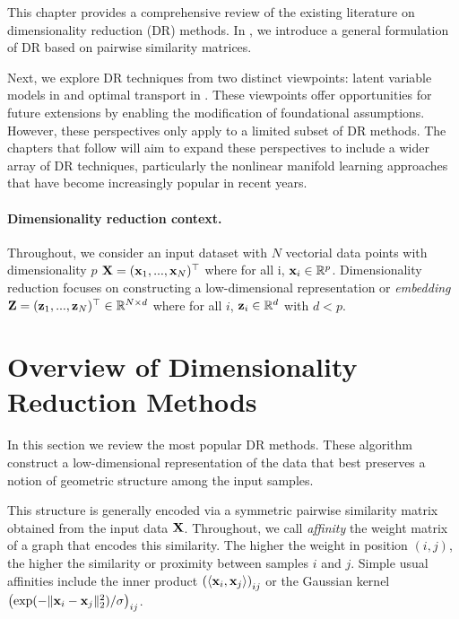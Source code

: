 \newpage

This chapter provides a comprehensive review of the existing literature on dimensionality reduction (DR) methods. In , we introduce a general formulation of DR based on pairwise similarity matrices.

Next, we explore DR techniques from two distinct viewpoints: latent variable models in  and optimal transport in . These viewpoints offer opportunities for future extensions by enabling the modification of foundational assumptions. However, these perspectives only apply to a limited subset of DR methods. The chapters that follow will aim to expand these perspectives to include a wider array of DR techniques, particularly the nonlinear manifold learning approaches that have become increasingly popular in recent years.


\paragraph{Dimensionality reduction context.}
Throughout, we consider an input dataset with $N$ vectorial data points with dimensionality $p$ \ie ${\mathbf{X}} = ({\mathbf{x}}_1, ..., {\mathbf{x}}_N) ^\top$ where for all i, ${\mathbf{x}}_i \in \mathbb{R}^{p}$. Dimensionality reduction focuses on constructing a low-dimensional representation or \emph{embedding} ${\mathbf{Z}} = ({\mathbf{z}}_1, ..., {\mathbf{z}}_N)^\top \in \mathbb{R}^{N \times d}$ where for all $i$, ${\mathbf{z}}_i \in \mathbb{R}^{d}$ with $d < p$.

\section{Overview of Dimensionality Reduction Methods}\label{sec:background_dr}

In this section we review the most popular DR methods. These algorithm construct a low-dimensional representation of the data that best preserves a notion of geometric structure among the input samples. 

This structure is generally encoded via a symmetric pairwise similarity matrix obtained from the input data ${\mathbf{X}}$. Throughout, we call \emph{affinity} the weight matrix of a graph that encodes this similarity. The higher the weight in position $(i,j)$, the
higher the similarity or proximity between samples $i$ and $j$. Simple usual affinities include the inner product $\left( \langle {\mathbf{x}}_i, {\mathbf{x}}_j \rangle \right)_{ij}$ or the Gaussian kernel $\left( \exp(-\|{\mathbf{x}}_i - {\mathbf{x}}_j\|_2^2) / \sigma \right)_{ij}$.

